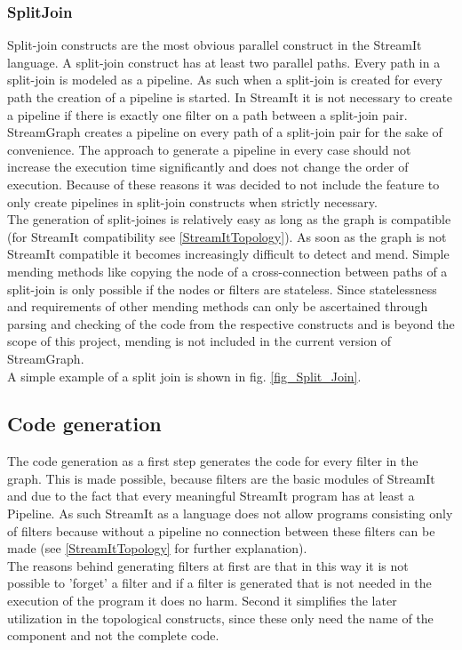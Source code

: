 \documentclass[journal]{IEEEtran}
\begin{document}
\subsubsection{SplitJoin}
\noindent Split-join constructs are the most obvious parallel construct in the
StreamIt language. A split-join construct has at least two parallel paths. Every
path in a split-join is modeled as a pipeline. As such when a split-join is
created for every path the creation of a pipeline is started. In StreamIt it is
not necessary to create a pipeline if there is exactly one filter on a path
between a split-join pair. StreamGraph creates a pipeline on every path of a
split-join pair for the sake of convenience. The approach to generate a
pipeline in every case should not increase the execution time significantly and
does not change the order of execution. Because of these reasons it was decided
to not include the feature to only create pipelines in split-join constructs
when strictly necessary.\\
The generation of split-joines is relatively easy as long as the graph is compatible
(for StreamIt compatibility see \ref{StreamItTopology}). As soon as the graph is not 
StreamIt compatible it becomes increasingly difficult to detect and mend. Simple 
mending methods like copying the node of a cross-connection between paths of a 
split-join is only possible if the nodes or filters are stateless. Since 
statelessness and requirements of other mending methods can only be ascertained 
through parsing and checking of the code from the respective constructs and is beyond 
the scope of this project, mending is not included in the current version of StreamGraph.\\
A simple example of a split join is shown in fig. \ref{fig_Split_Join}.\\


\subsection{Code generation}
\noindent The code generation as a first step generates the code for every
filter in the graph. This is made possible, because filters are the basic
modules of StreamIt and due to the fact that every meaningful StreamIt program
has at least a Pipeline. As such StreamIt as a language does not allow programs
consisting only of filters because without a pipeline no connection between
these filters can be made (see \ref{StreamItTopology} for further
explanation). \\
The reasons behind generating filters at first are that in this 
way it is not possible to 'forget' a filter and if a filter is generated that 
is not needed in the execution of the program it does no harm. Second it 
simplifies the later utilization in the topological constructs, since these 
only need the name of the component and not the complete code.\\
\end{document}
